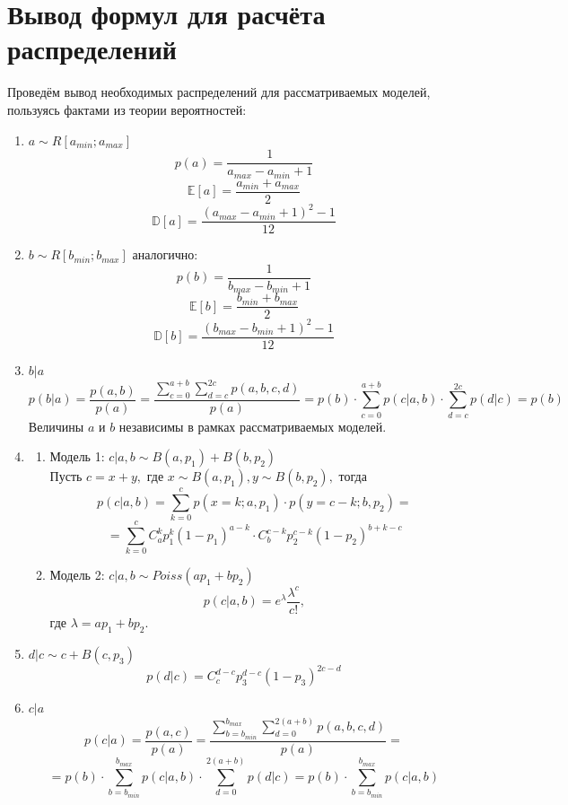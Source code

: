 \documentclass[12pt,a4paper,oneside,fleqn,leqno]{article}
\begin{document}
	\section{Вывод формул для расчёта распределений}
			Проведём вывод необходимых распределений для рассматриваемых моделей, пользуясь фактами из теории вероятностей:
			\begin{enumerate}
				\item $a \sim R[a_{min}; a_{max}]$
				$$p(a) = \frac{1}{a_{max} - a_{min} + 1}$$
				$$\mathbb{E}[a] = \frac{a_{min} + a_{max}}{2}$$
				$$\mathbb{D}[a] = \frac{(a_{max} - a_{min} + 1)^2 - 1}{12}$$
				\item $b \sim R[b_{min}; b_{max}]$ аналогично:\\
				$$p(b) = \frac{1}{b_{max} - b_{min} + 1}$$
				$$\mathbb{E}[b] = \frac{b_{min} + b_{max}}{2}$$
				$$\mathbb{D}[b] = \frac{(b_{max} - b_{min} + 1)^2 - 1}{12}$$
				\item $b|a$
				$$ p(b|a) = \frac{p(a, b)}{p(a)} = \frac{\sum\limits_{c = 0}^{a + b} \sum\limits_{d = c}^{2c} p(a, b, c, d)}{p(a)} = p(b) \cdot \sum\limits_{c = 0}^{a + b} p(c|a, b) \cdot \sum\limits_{d = c}^{2c} p(d|c) = p(b)$$
				Величины $a$ и $b$ независимы в рамках рассматриваемых моделей.
				\item 
				\begin{enumerate}
					\item Модель 1: $c|a,b \sim B(a, p_1) + B(b, p_2)$\\
					Пусть $c = x + y,$ где $x \sim B(a, p_1), y \sim B(b, p_2),$ тогда
					$$p(c|a,b) = \sum_{k = 0}^c p(x = k; a, p_1) \cdot p(y = c - k; b, p_2) = $$ $$
				=\sum_{k = 0}^c C_a^k p_1^k (1 - p_1)^{a - k} \cdot C_b^{c - k} p_2^{c - k} (1 - p_2)^{b + k - c}$$
					\item Модель 2: $c|a,b \sim Poiss(ap_1 + bp_2)$
					$$p(c|a,b) = e^{\lambda}\frac{\lambda^c}{c!},$$ где $\lambda = ap_1 + bp_2.$
				\end{enumerate}
				\item $d|c \sim c + B(c, p_3)$
				$$ p(d|c) = C_{c}^{d - c}p_3^{d - c}(1 - p_3)^{2c - d}$$
				\item $c|a$
				$$p(c|a) = \frac{p(a, c)}{p(a)} = \frac{\sum\limits_{b = b_{min}}^{b_{max}} \sum\limits_{d = 0}^{2(a + b)}p(a, b, c, d) }{p(a)} = $$ $$ = p(b) \cdot \sum\limits_{b = b_{min}}^{b_{max}} p(c|a, b) \cdot \sum\limits_{d = 0}^{2(a + b)}p(d|c) = p(b) \cdot \sum\limits_{b = b_{min}}^{b_{max}} p(c|a, b)$$

\end{enumerate}
\end{document}
